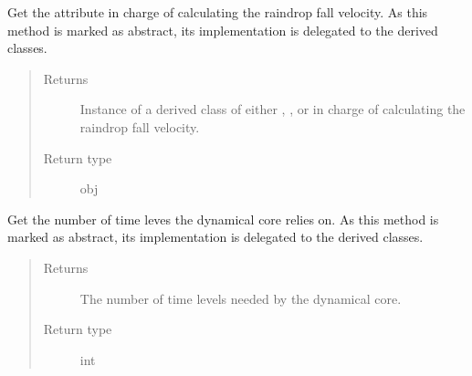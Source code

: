 \documentclass[letterpaper,10pt,english]{sphinxmanual}
\begin{document}
\begin{fulllineitems}
\begin{fulllineitems}
\end{fulllineitems}


\begin{fulllineitems}
\label{\detokenize{api:tasmania.dycore.dycore.DynamicalCore.microphysics}}
Get the attribute in charge of calculating the raindrop fall velocity.
As this method is marked as abstract, its implementation is delegated to the derived classes.
\begin{quote}\begin{description}
\item[{Returns}] \leavevmode
Instance of a derived class of either
{\hyperref[\detokenize{api:tasmania.parameterizations.slow_tendencies.SlowTendencyMicrophysics}]{}},
,
or {\hyperref[\detokenize{api:tasmania.parameterizations.adjustments.AdjustmentMicrophysics}]{}} in
charge of calculating the raindrop fall velocity.

\item[{Return type}] \leavevmode
obj

\end{description}\end{quote}

\end{fulllineitems}


\begin{fulllineitems}
\label{\detokenize{api:tasmania.dycore.dycore.DynamicalCore.time_levels}}
Get the number of time leves the dynamical core relies on.
As this method is marked as abstract, its implementation is delegated to the derived classes.
\begin{quote}\begin{description}
\item[{Returns}] \leavevmode
The number of time levels needed by the dynamical core.

\item[{Return type}] \leavevmode
int

\end{description}\end{quote}

\end{fulllineitems}


\end{fulllineitems}
\end{document}
